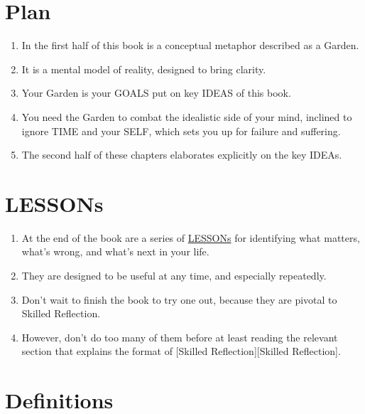 \documentclass[
]{book}
\providecommand{\tightlist}{%
  \setlength{\itemsep}{0pt}\setlength{\parskip}{0pt}}
\begin{document}
\hypertarget{plan}{%
\section{Plan}\label{plan}}

\begin{enumerate}
\def\labelenumi{\arabic{enumi}.}
\setcounter{enumi}{35}
\tightlist
\item
  In the first half of this book is a conceptual metaphor described as a Garden.
\item
  It is a mental model of reality, designed to bring clarity.
\item
  Your Garden is your GOALS put on key IDEAS of this book.
\item
  You need the Garden to combat the idealistic side of your mind, inclined to ignore TIME and your SELF, which sets you up for failure and suffering.
\item
  The second half of these chapters elaborates explicitly on the key IDEAs.
\end{enumerate}

\hypertarget{lessons}{%
\section{LESSONs}\label{lessons}}

\begin{enumerate}
\def\labelenumi{\arabic{enumi}.}
\setcounter{enumi}{40}
\tightlist
\item
  At the end of the book are a series of \protect\hyperlink{zero-or-one}{LESSONs} for identifying what matters, what's wrong, and what's next in your life.
\item
  They are designed to be useful at any time, and especially repeatedly.
\item
  Don't wait to finish the book to try one out, because they are pivotal to Skilled Reflection.
\item
  However, don't do too many of them before at least reading the relevant section that explains the format of {[}Skilled Reflection{]}{[}Skilled Reflection{]}.
\end{enumerate}

\hypertarget{definitions}{%
\section{Definitions}\label{definitions}}
\end{document}
